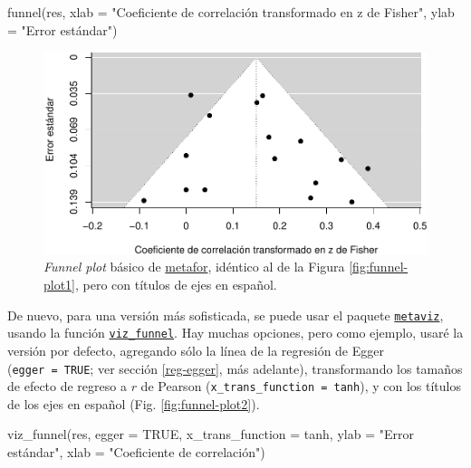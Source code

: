 \documentclass[
  bookmarksnumbered]{article}
\newenvironment{Shaded}{\begin{snugshade}}{\end{snugshade}}
\newcommand{\AttributeTok}[1]{\textcolor[rgb]{0.00,0.34,0.68}{#1}}
\newcommand{\ConstantTok}[1]{\textcolor[rgb]{0.67,0.33,0.00}{#1}}
\newcommand{\FunctionTok}[1]{\textcolor[rgb]{0.39,0.29,0.61}{#1}}
\newcommand{\NormalTok}[1]{\textcolor[rgb]{0.12,0.11,0.11}{#1}}
\newcommand{\StringTok}[1]{\textcolor[rgb]{0.75,0.01,0.01}{#1}}
\begin{document}
\begin{Shaded}
\begin{Highlighting}[]
\FunctionTok{funnel}\NormalTok{(res, }
       \AttributeTok{xlab =} \StringTok{"Coeficiente de correlación transformado en z de Fisher"}\NormalTok{,}
       \AttributeTok{ylab =} \StringTok{"Error estándar"}\NormalTok{)}
\end{Highlighting}
\end{Shaded}

\begin{figure}
\centering
\includegraphics{Meta-analysis_files/figure-latex/funnel-plot1a-1.pdf}
\caption{\label{fig:funnel-plot1a}\emph{Funnel plot} básico de \href{https://www.metafor-project.org/doku.php}{metafor}, idéntico al de la Figura \ref{fig:funnel-plot1}, pero con títulos de ejes en español.}
\end{figure}

De nuevo, para una versión más sofisticada, se puede usar el paquete \href{https://cran.r-project.org/web/packages/metaviz/vignettes/metaviz.html}{\texttt{metaviz}}, usando la función \href{https://cran.r-project.org/web/packages/metaviz/vignettes/metaviz.html\#creating-funnel-plots-with-viz_funnel}{\texttt{viz\_funnel}}. Hay muchas opciones, pero como ejemplo, usaré la versión por defecto, agregando sólo la línea de la regresión de Egger (\texttt{egger\ =\ TRUE}; ver sección \ref{reg-egger}, más adelante), transformando los tamaños de efecto de regreso a \(r\) de Pearson (\texttt{x\_trans\_function\ =\ tanh}), y con los títulos de los ejes en español (Fig. \ref{fig:funnel-plot2}).

\begin{Shaded}
\begin{Highlighting}[]
\FunctionTok{viz\_funnel}\NormalTok{(res, }
           \AttributeTok{egger =} \ConstantTok{TRUE}\NormalTok{,}
           \AttributeTok{x\_trans\_function =}\NormalTok{ tanh,}
           \AttributeTok{ylab =} \StringTok{"Error estándar"}\NormalTok{,}
           \AttributeTok{xlab =} \StringTok{"Coeficiente de correlación"}\NormalTok{)}
\end{Highlighting}
\end{Shaded}
\end{document}
